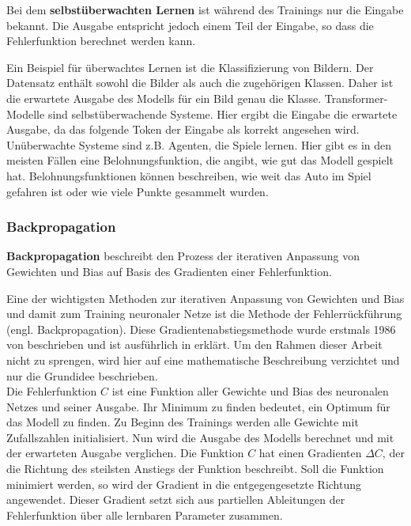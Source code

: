 \begin{definition}\label{def:selbstueberwachtes-lernen}
    Bei dem \textbf{selbstüberwachten Lernen} ist während des Trainings nur die Eingabe bekannt.
    Die Ausgabe entspricht jedoch einem Teil der Eingabe, so dass die Fehlerfunktion berechnet werden kann.
\end{definition}

Ein Beispiel für überwachtes Lernen ist die Klassifizierung von Bildern.
Der Datensatz enthält sowohl die Bilder als auch die zugehörigen Klassen.
Daher ist die erwartete Ausgabe des Modells für ein Bild genau die Klasse.
Transformer-Modelle sind selbstüberwachende Systeme.
Hier ergibt die Eingabe die erwartete Ausgabe, da das folgende Token der Eingabe als korrekt angesehen wird.
Unüberwachte Systeme sind z.B. Agenten, die Spiele lernen.
Hier gibt es in den meisten Fällen eine Belohnungsfunktion, die angibt, wie gut das Modell gespielt hat.
Belohnungsfunktionen können beschreiben, wie weit das Auto im Spiel gefahren ist oder wie viele Punkte gesammelt wurden.\\
\subsubsection{Backpropagation}\label{subsec:backpropagation}
\begin{definition}\label{def:backpropagation}
    \textbf{Backpropagation} beschreibt den Prozess der iterativen Anpassung von Gewichten und Bias auf Basis des Gradienten einer Fehlerfunktion.
\end{definition}

Eine der wichtigsten Methoden zur iterativen Anpassung von Gewichten und Bias und damit zum Training neuronaler Netze ist die Methode der Fehlerrückführung (engl. Backpropagation).
Diese Gradientenabstiegsmethode wurde erstmals 1986 von \citet{backpropagation} beschrieben und ist ausführlich in \citet{neuronale-netze} erklärt.
Um den Rahmen dieser Arbeit nicht zu sprengen, wird hier auf eine mathematische Beschreibung verzichtet und nur die Grundidee beschrieben.\\

Die Fehlerfunktion $C$ ist eine Funktion aller Gewichte und Bias des neuronalen Netzes und seiner Ausgabe.
Ihr Minimum zu finden bedeutet, ein Optimum für das Modell zu finden.
Zu Beginn des Trainings werden alle Gewichte mit Zufallszahlen initialisiert.
Nun wird die Ausgabe des Modells berechnet und mit der erwarteten Ausgabe verglichen.
Die Funktion $C$ hat einen Gradienten $\Delta C$, der die Richtung des steilsten Anstiegs der Funktion beschreibt.
Soll die Funktion minimiert werden, so wird der Gradient in die entgegengesetzte Richtung angewendet.
Dieser Gradient setzt sich aus partiellen Ableitungen der Fehlerfunktion über alle lernbaren Parameter zusammen.\\

